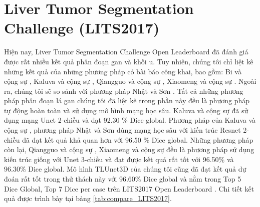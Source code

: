 \section{Liver Tumor Segmentation Challenge (LITS2017)}
Hiện nay, Liver Tumor Segmentation Challenge Open Leaderboard \cite{website:LiTS_learderboard}  đã đánh giá được rất nhiều kết quả phân đoạn gan và khối u. Tuy nhiên, chúng tôi chỉ liệt kê những kết quả của những phương pháp có bài báo công khai, bao gồm: Bi và cộng sự  \cite{Lei_paper}, Kaluva và cộng sự  \cite{Krishna_paper}, Qiangguo và cộng sự  \cite{Qiangguo_paper}, Xiaomeng và cộng sự  \cite{Xiaomeng_paper} . Ngoài ra, chúng tôi sẽ so sánh với phương pháp Nhật và Sơn \cite{Beichel_paper}. Tất cả những phương pháp phân đoạn lá gan chúng tôi đã liệt kê trong phần này đều là phương pháp tự động hoàn toàn và  sử dụng mô hình mạng học sâu. Kaluva và cộng sự  \cite{Krishna_paper} đã sử dụng mạng Unet 2-chiều và đạt 92.30 \% Dice global. Phương pháp của Kaluva và cộng sự  \cite{Krishna_paper}, phương pháp Nhật và Sơn \cite{Beichel_paper} dùng mạng học sâu với kiến trúc Resnet 2-chiều đã đạt kết quả khả quan hơn với 96.50 \% Dice global. Những phương pháp còn lại, Qiangguo và cộng sự  \cite{Qiangguo_paper}, Xiaomeng và cộng sự  \cite{Xiaomeng_paper} đều là phương pháp sử dụng kiến trúc giống với Unet 3-chiều và đạt được kết quả rất tốt với 96.50\% và 96.30\% Dice global. Mô hình TLUnet3D của chúng tôi cũng đã đạt kết quả dự đoán rất tốt trong thử thách này với 96.60\% Dice global và nằm trong Top 5 Dice Global, Top 7 Dice per case trên LITS2017 Open Leaderboard \cite{website:LiTS_learderboard}. Chi tiết kết quả được trình bày tại bảng \ref{tab:compare_LITS2017}.

